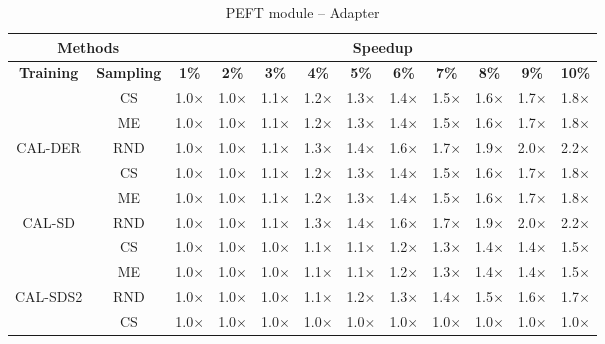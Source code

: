 \begin{table}[htbp]
\centering
\begin{subtable}{\linewidth}
\centering
\caption{PEFT module -- Adapter}

\begin{tabular}{c|c|cccccccccc}
\toprule
\multicolumn{2}{c|}{\textbf{Methods}} & \multicolumn{10}{c}{\textbf{Speedup}} \\
\midrule
\textbf{Training} & \textbf{Sampling} & \textbf{1\%} & \textbf{2\%} & \textbf{3\%} & \textbf{4\%} & \textbf{5\%} & \textbf{6\%} & \textbf{7\%} & \textbf{8\%} & \textbf{9\%} & \textbf{10\%}\\
\midrule
 & CS & 1.0$\times$ & 1.0$\times$ & 1.1$\times$ & 1.2$\times$ & 1.3$\times$ & 1.4$\times$ & 1.5$\times$ & 1.6$\times$ & 1.7$\times$ & 1.8$\times$\\

 & ME & 1.0$\times$ & 1.0$\times$ & 1.1$\times$ & 1.2$\times$ & 1.3$\times$ & 1.4$\times$ & 1.5$\times$ & 1.6$\times$ & 1.7$\times$ & 1.8$\times$\\

\multirow{-3}{*}{\raggedright\arraybackslash CAL-DER} & RND & 1.0$\times$ & 1.0$\times$ & 1.1$\times$ & 1.3$\times$ & 1.4$\times$ & 1.6$\times$ & 1.7$\times$ & 1.9$\times$ & 2.0$\times$ & 2.2$\times$\\
\midrule
 & CS & 1.0$\times$ & 1.0$\times$ & 1.1$\times$ & 1.2$\times$ & 1.3$\times$ & 1.4$\times$ & 1.5$\times$ & 1.6$\times$ & 1.7$\times$ & 1.8$\times$\\

 & ME & 1.0$\times$ & 1.0$\times$ & 1.1$\times$ & 1.2$\times$ & 1.3$\times$ & 1.4$\times$ & 1.5$\times$ & 1.6$\times$ & 1.7$\times$ & 1.8$\times$\\

\multirow{-3}{*}{\raggedright\arraybackslash CAL-SD} & RND & 1.0$\times$ & 1.0$\times$ & 1.1$\times$ & 1.3$\times$ & 1.4$\times$ & 1.6$\times$ & 1.7$\times$ & 1.9$\times$ & 2.0$\times$ & 2.2$\times$\\
\midrule
 & CS & 1.0$\times$ & 1.0$\times$ & 1.0$\times$ & 1.1$\times$ & 1.1$\times$ & 1.2$\times$ & 1.3$\times$ & 1.4$\times$ & 1.4$\times$ & 1.5$\times$\\

 & ME & 1.0$\times$ & 1.0$\times$ & 1.0$\times$ & 1.1$\times$ & 1.1$\times$ & 1.2$\times$ & 1.3$\times$ & 1.4$\times$ & 1.4$\times$ & 1.5$\times$\\

\multirow{-3}{*}{\raggedright\arraybackslash CAL-SDS2} & RND & 1.0$\times$ & 1.0$\times$ & 1.0$\times$ & 1.1$\times$ & 1.2$\times$ & 1.3$\times$ & 1.4$\times$ & 1.5$\times$ & 1.6$\times$ & 1.7$\times$\\
\midrule
 & CS & 1.0$\times$ & 1.0$\times$ & 1.0$\times$ & 1.0$\times$ & 1.0$\times$ & 1.0$\times$ & 1.0$\times$ & 1.0$\times$ & 1.0$\times$ & 1.0$\times$\\


\end{tabular}
\end{subtable}
\end{table}
